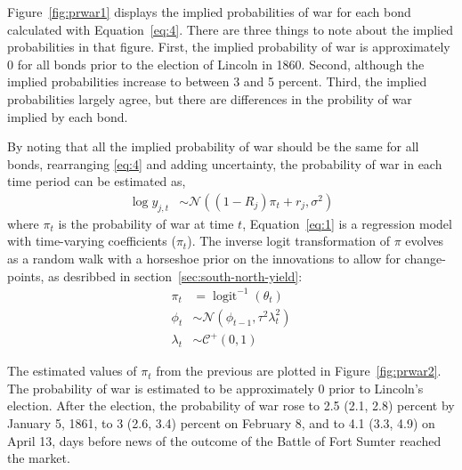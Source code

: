 \documentclass[11pt, oneside, article]{memoir}\usepackage[]{graphicx}\usepackage[]{color}
\newcommand{\dist}[1]{\mathcal{#1}}
\newcommand{\paren}[1]{\mathopen{}\left(#1\right)\mathclose{}}
\newcommand{\disti}[2]{\ensuremath{\dist{#1}\paren{#2}}}
\newcommand{\dnorm}[1]{\disti{N}{#1}}
\newcommand{\dhalfcauchy}[1]{\disti{C^+}{#1}}
\DeclareMathOperator{\logit}{logit}
\begin{document}
Figure~\ref{fig:prwar1} displays the implied probabilities of war for each bond calculated with Equation~\eqref{eq:4}.
There are three things to note about the implied probabilities in that figure.
First, the implied probability of war is approximately 0 for all bonds prior to the election of Lincoln in 1860.
Second, although the implied probabilities increase to between 3 and 5 percent.
Third, the implied probabilities largely agree, but there are differences in the probility of war implied by each bond.

By noting that all the implied probability of war should be the same for all bonds, rearranging \eqref{eq:4} and adding uncertainty, the probability of war in each time period can be estimated as,
\begin{align}
  \label{eq:1}
  \log y_{j,t} & \sim \dnorm{(1 - R_{j}) \pi_{t} + r_{j}, \sigma^{2}}
\end{align}
where $\pi_{t}$ is the probability of war at time $t$,
Equation~\eqref{eq:1} is a regression model with time-varying coefficients ($\pi_{t}$).
The inverse logit transformation of $\pi$ evolves as a random walk with a horseshoe prior on the innovations to allow for change-points, as desribbed  in section~\ref{sec:south-north-yield}:
\begin{align}
  \pi_{t} &= \logit^{-1}(\theta_{t}) \\
  \phi_{t} &\sim \dnorm{\phi_{t-1}, \tau^{2} \lambda_{t}^{2}} \\
  \lambda_{t} &\sim \dhalfcauchy{0, 1}
\end{align}

The estimated values of $\pi_{t}$ from the previous are plotted in Figure~\ref{fig:prwar2}.
The probability of war is estimated to be approximately 0 prior to Lincoln's election.
After the election, the probability of war rose to 2.5 (2.1, 2.8) percent by January 5, 1861,
to 3 (2.6, 3.4) percent on February 8, and to 4.1 (3.3, 4.9) on April 13, days before news of the outcome of the Battle of Fort Sumter reached the market.
\end{document}
